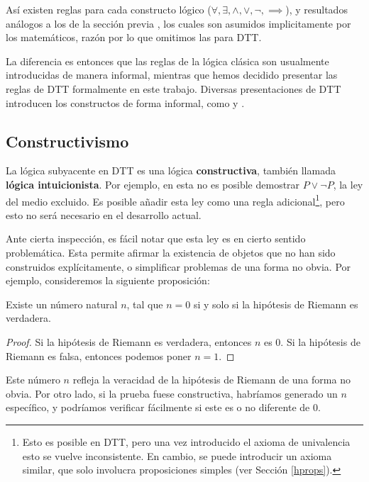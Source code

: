 \documentclass[../main.tex]{subfiles}
\begin{document}
As\'i existen reglas para cada constructo l\'ogico ($\forall, \exists, \wedge, \vee, \neg, \implies$), y resultados an\'alogos a los de la sección previa \cite{chiswell_mathematical_2007}, los cuales son asumidos implicitamente por los matemáticos, raz\'on por lo que omitimos las  para DTT.

La diferencia es entonces que las reglas de la l\'ogica cl\'asica son usualmente introducidas de manera informal, mientras que hemos decidido presentar las reglas de DTT formalmente en este trabajo.
Diversas presentaciones de DTT introducen los constructos de forma informal, como \cite{nordstrom_programming_1990} y \cite{friedman_little_2018}.

\subsection*{Constructivismo}
La l\'ogica subyacente en DTT es una l\'ogica \textbf{constructiva}, también llamada \textbf{l\'ogica intuicionista}.
Por ejemplo, en esta no es posible demostrar $P \vee \neg P$, la ley del medio excluido.
Es posible a\~nadir esta ley como una regla adicional\footnote{Esto es posible en DTT, pero una vez introducido el axioma de univalencia esto se vuelve inconsistente. En cambio, se puede introducir un axioma similar, que solo involucra proposiciones simples (ver Sección \ref{hprops}).}, pero esto no ser\'a necesario en el desarrollo actual.

Ante cierta inspecci\'on, es f\'acil notar que esta ley es en cierto sentido problem\'atica.
Esta permite afirmar la existencia de objetos que no han sido construidos expl\'icitamente, o simplificar problemas de una forma no obvia. Por ejemplo, consideremos la siguiente proposici\'on:

\begin{proposition}
    Existe un n\'umero natural $n$, tal que $n=0$ si y solo si la hipótesis de Riemann es verdadera.
\end{proposition}

\begin{proof}
    Si la hipótesis de Riemann es verdadera, entonces $n$ es 0. Si la hipótesis de Riemann es falsa, entonces podemos poner $n=1$.
\end{proof}

Este n\'umero $n$ refleja la veracidad de la hip\'otesis de Riemann de una forma no obvia.
Por otro lado, si la prueba fuese constructiva, habr\'iamos generado un $n$ espec\'ifico, y podr\'iamos verificar f\'acilmente si este es o no diferente de 0.
\end{document}
